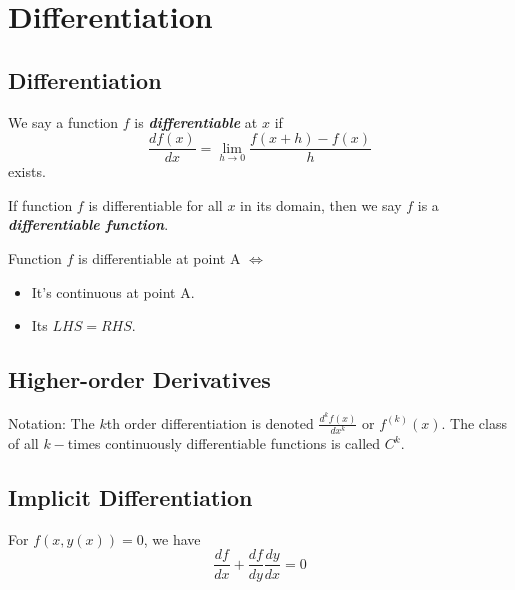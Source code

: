 \section{Differentiation}

\subsection{Differentiation}

\begin{definition}
    We say a function $f$ is \textit{\textbf{differentiable}} at $x$ if
    \begin{equation*}
        \frac{d f(x)}{dx} = \lim_{h \to 0}\frac{f(x+h)-f(x)}{h}
    \end{equation*}
    exists.
\end{definition}

\begin{definition}
    If function $f$ is differentiable for all $x$ in its domain, then we say $f$ is a \textbf{\textit{differentiable function}}.
\end{definition}

\begin{remark*}
    Function $f$ is differentiable at point A $\iff $
    \begin{itemize}
        \item It's continuous at point A.
        \item Its $LHS = RHS$.
    \end{itemize}
\end{remark*}

\subsection{Higher-order Derivatives}

Notation: The $k$th order differentiation is denoted $\frac{d ^{k}f(x)}{dx ^{k}}$ or $f ^{(k)}(x)$. The class of all $k-$times continuously differentiable functions is called $C^k$.

\subsection{Implicit Differentiation}

\begin{proposition}
    For $f(x, y(x)) = 0$, we have \begin{equation*}
        \frac{df}{dx} + \frac{df}{dy}\frac{dy}{dx} = 0
    \end{equation*}
\end{proposition}

